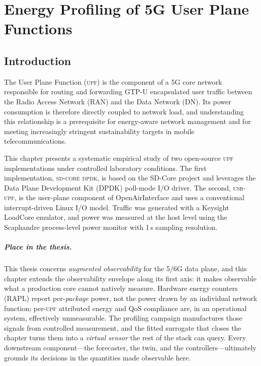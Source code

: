 \documentclass[12pt, a4paper]{report}
\newcommand{\dpdk}{\textsc{sd-core dpdk}}
\newcommand{\usr}{\textsc{usr-upf}}
\newcommand{\upf}{\textsc{upf}}
\begin{document}

\chapter{Energy Profiling of 5G User Plane Functions}
\label{chap:upf_profiling}

\section{Introduction}
\label{sec:intro}

The User Plane Function (\upf{}) is the component of a 5G core network
responsible for routing and forwarding GTP-U encapsulated user traffic between
the Radio Access Network (RAN) and the Data Network (DN).
Its power consumption is therefore directly coupled to network load, and
understanding this relationship is a prerequisite for energy-aware network
management and for meeting increasingly stringent sustainability targets in
mobile telecommunications.

This chapter presents a systematic empirical study of two open-source \upf{}
implementations under controlled laboratory conditions.
The first implementation, \dpdk{}, is based on the SD-Core project and
leverages the Data Plane Development Kit (DPDK) poll-mode I/O driver.
The second, \usr{}, is the user-plane component of OpenAirInterface and
uses a conventional interrupt-driven Linux I/O model.
Traffic was generated with a Keysight LoadCore emulator, and power was
measured at the host level using the Scaphandre process-level power monitor
with 1\,s sampling resolution.

\paragraph{Place in the thesis.} This thesis concerns \emph{augmented
observability} for the 5/6G data plane, and this chapter extends the
observability envelope along its first axis: it makes observable what a
production core cannot natively measure. Hardware energy counters (RAPL) report
per-\emph{package} power, not the power drawn by an individual network function;
per-\upf{} attributed energy and QoS compliance are, in an operational system,
effectively unmeasurable. The profiling campaign manufactures those signals from
controlled measurement, and the fitted surrogate that closes the chapter turns
them into a \emph{virtual sensor} the rest of the stack can query. Every
downstream component---the forecaster, the twin, and the controllers---ultimately
grounds its decisions in the quantities made observable here.
\end{document}
